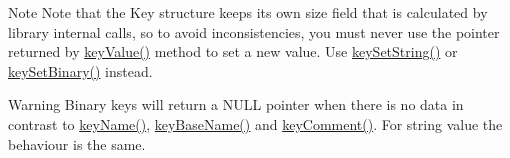 \begin{DoxyNote}{Note}
Note that the Key structure keeps its own size field that is calculated by library internal calls, so to avoid inconsistencies, you must never use the pointer returned by \hyperlink{group__keyvalue_ga6f29609c5da53c6dc26a98678d5752af}{key\+Value()} method to set a new value. Use \hyperlink{group__keyvalue_ga622bde1eb0e0c4994728331326340ef2}{key\+Set\+String()} or \hyperlink{group__keyvalue_gaa50a5358fd328d373a45f395fa1b99e7}{key\+Set\+Binary()} instead.
\end{DoxyNote}
\begin{DoxyWarning}{Warning}
Binary keys will return a N\+U\+LL pointer when there is no data in contrast to \hyperlink{group__keyname_ga8e805c726a60da921d3736cda7813513}{key\+Name()}, \hyperlink{group__keyname_gaaff35e7ca8af5560c47e662ceb9465f5}{key\+Base\+Name()} and \hyperlink{group__meta_gac89fd319783b3457db45b4c09e55274a}{key\+Comment()}. For string value the behaviour is the same.
\end{DoxyWarning}

